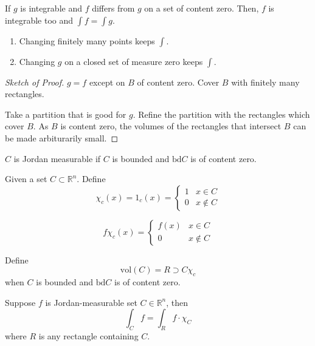 \documentclass[a4paper]{article}
\numberwithin{equation}{section}
\newcommand{\R}{\mathbb{R}}
\newcommand{\vol}{\mathrm{vol}}
\begin{document}
\begin{corollary}
    If $g$ is integrable and $f$ differs from $g$ on a set of content zero. Then, $f$ is integrable too and $\int f=\int g$.
    \begin{enumerate}
        \item Changing finitely many points keeps $\int$.
        \item Changing $g$ on a closed set of measure zero keeps $\int$.
    \end{enumerate}

    \begin{proof}[Sketch of Proof]
        $g=f$ except on $B$ of content zero. Cover $B$ with finitely many rectangles.

        Take a partition that is good for $g$. Refine the partition with the rectangles which cover $B$. As $B$ is content zero, the volumes of the rectangles that intersect $B$ can be made arbiturarily small.
    \end{proof}
\end{corollary}
\begin{definition}
    $C$ is Jordan measurable if $C$ is bounded and $\textrm{bd}C$ is of content zero.
\end{definition}
\begin{definition}
    Given a set $C\subset\R^n$. Define 
    \begin{equation}
        \chi_c(x)=1_c(x)=\begin{cases}
            1 & x\in C\\
            0 & x\notin C
        \end{cases}
    \end{equation}

    \begin{equation}
        f\chi_c(x)=\begin{cases}
            f(x) & x\in C\\
            0 & x\notin C
        \end{cases}
    \end{equation}

    Define \begin{equation}
        \vol(C)={R\supset C}\chi_c
    \end{equation}
    when $C$ is bounded and $\textrm{bd}C$ is of content zero.

    Suppose $f$ is Jordan-measurable set $C\in\R^n$, then 
    \begin{equation}
        \int_Cf=\int_Rf\cdot\chi_C
    \end{equation} 
    where $R$ is any rectangle containing $C$.

\end{definition}
\end{document}
